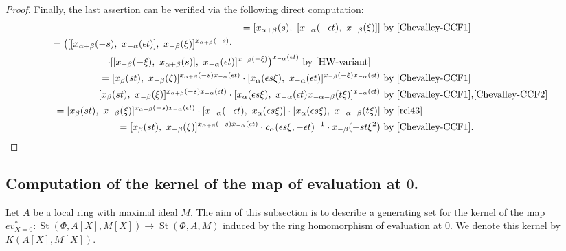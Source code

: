 \documentclass[oneside, 8pt]{amsart}
\theoremstyle{remark}
\theoremstyle{definition}
\numberwithin{lemma}{section}
\numberwithin{prop}{section}
\numberwithin{corollary}{section}
\numberwithin{externaltheorem}{section}
\DeclareMathOperator{\St}{St}
\numberwithin{equation}{section}
\begin{document}
\begin{proof}
Finally, the last assertion can be verified via the following direct computation:
\begin{align*}
[x_{\alpha+\beta}(s),\ x_{-\alpha-\beta}(t\xi)] = [x_{\alpha+\beta}(s),\ [x_{-\alpha}(-\epsilon t),\ x_{-\beta}(\xi)]]&\ \text{by~\eqref{Chevalley-CCF1}}\\
\begin{split}
    =\bigl( [[x_{\alpha+\beta}(-s),\ x_{-\alpha}(\epsilon t)],\ x_{-\beta}(\xi)] ^ {x_{\alpha+\beta}(-s)} \cdot \hspace{70pt} \\
        \cdot [[ x_{-\beta}(-\xi),\ x_{\alpha+\beta}(s)],\ x_{-\alpha}(\epsilon t)]^{x_{-\beta}(-\xi)}\bigr)^{x_{-\alpha}(\epsilon t)} &\ \text{by~\eqref{HW-variant}}
\end{split}\\
= [x_{\beta}(st),\ x_{-\beta}(\xi)] ^ {x_{\alpha+\beta}(-s) x_{-\alpha}(\epsilon t)} \cdot [x_{\alpha}(\epsilon s\xi),\ x_{-\alpha}(\epsilon t)]^{x_{-\beta}(-\xi)x_{-\alpha}(\epsilon t)} &\ \text{by~\eqref{Chevalley-CCF1}}\\
= [x_{\beta}(st),\ x_{-\beta}(\xi)] ^ {x_{\alpha+\beta}(-s) x_{-\alpha}(\epsilon t)} \cdot [x_{\alpha}(\epsilon s\xi),\ x_{-\alpha}(\epsilon t) x_{-\alpha-\beta}(t\xi)]^{x_{-\alpha}(\epsilon t)} &\ \text{by~\eqref{Chevalley-CCF1},\eqref{Chevalley-CCF2}}\\
= [x_{\beta}(st),\ x_{-\beta}(\xi)] ^ {x_{\alpha+\beta}(-s) x_{-\alpha}(\epsilon t)} \cdot [x_{-\alpha}(-\epsilon t),\ x_{\alpha}(\epsilon s\xi)] \cdot [x_{\alpha}(\epsilon s\xi),\ x_{-\alpha-\beta}(t\xi)] &\ \text{by~\eqref{rel43}}\\
= [x_{\beta}(st),\ x_{-\beta}(\xi)] ^ {x_{\alpha+\beta}(-s) x_{-\alpha}(\epsilon t)} \cdot c_{\alpha}(\epsilon s\xi, -\epsilon t)^{-1} \cdot x_{-\beta}(-st\xi^2)  &\ \text{by~\eqref{Chevalley-CCF1}}. \qedhere
\end{align*}
\end{proof}

\subsection{Computation of the kernel of the map of evaluation at $0$.}\label{sec:computationOfK}
Let $A$ be a local ring with maximal ideal $M$.
The aim of this subsection is to describe a generating set for the kernel of the map $ev_{X=0}^*\colon\overline{\St}(\Phi, A[X], M[X]) \to \overline{\St}(\Phi, A, M)$
induced by the ring homomorphism of evaluation at $0$. We denote this kernel by $K(A[X], M[X])$.
\end{document}
